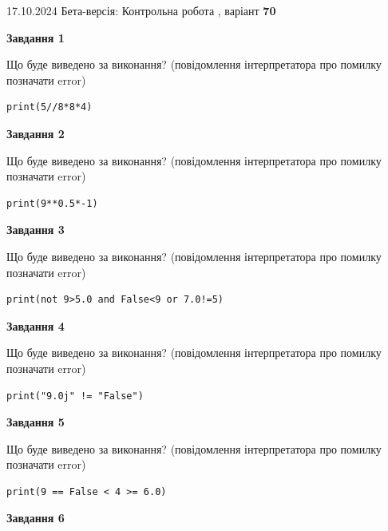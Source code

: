 \documentclass[12pt, ukrainian]{article}
\begin{document}
{\Large{17.10.2024 Бета-версія: Контрольна робота , варіант  \No \textbf { 70 }\par}}
{
\begin {large}
{\begin {center}\textbf{Завдання 1}\end {center}}

Що буде виведено за виконання? (повідомлення інтерпретатора про помилку позначати error)\par
\begin{verbatim}
print(5//8*8*4)
\end{verbatim}

{\begin {center}\textbf{Завдання 2}\end {center}}

Що буде виведено за виконання? (повідомлення інтерпретатора про помилку позначати error)\par
\begin{verbatim}
print(9**0.5*-1)
\end{verbatim}

{\begin {center}\textbf{Завдання 3}\end {center}}

Що буде виведено за виконання? (повідомлення інтерпретатора про помилку позначати error)\par
\begin{verbatim}
print(not 9>5.0 and False<9 or 7.0!=5)
\end{verbatim}

{\begin {center}\textbf{Завдання 4}\end {center}}

Що буде виведено за виконання? (повідомлення інтерпретатора про помилку позначати error)\par
\begin{verbatim}
print("9.0j" != "False")
\end{verbatim}

{\begin {center}\textbf{Завдання 5}\end {center}}

Що буде виведено за виконання? (повідомлення інтерпретатора про помилку позначати error)\par
\begin{verbatim}
print(9 == False < 4 >= 6.0)
\end{verbatim}

{\begin {center}\textbf{Завдання 6}\end {center}}


\end{large}}
\end{document}
